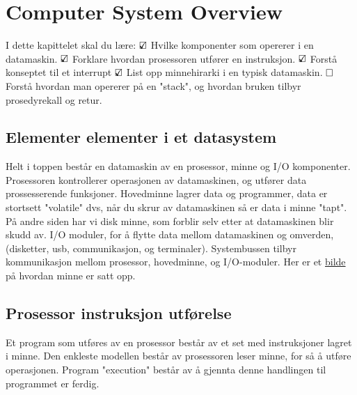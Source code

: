 \chapter{Computer System Overview}
I dette kapittelet skal du lære:\newline \newline
$\text{\rlap{$\checkmark$}}\square$ Hvilke komponenter som opererer i en datamaskin. \newline \newline
$\text{\rlap{$\checkmark$}}\square$ Forklare hvordan prosessoren utfører en instruksjon. \newline \newline
$\text{\rlap{$\checkmark$}}\square$ Forstå konseptet til et interrupt \newline \newline
$\text{\rlap{$\checkmark$}}\square$ List opp minnehirarki i en typisk datamaskin. \newline \newline
$\text{\rlap{}}\square$ Forstå hvordan man opererer på en "stack", og hvordan bruken tilbyr prosedyrekall og retur. \newline \newline

\section{Elementer elementer i et datasystem}
Helt i toppen består en datamaskin av en prosessor, minne og I/O komponenter.
Prosessoren kontrollerer operasjonen av datamaskinen, og utfører data prossesserende funksjoner.
\newline
Hovedminne lagrer data og programmer, data er stortsett "volatile" dvs, når du skrur av datamaskinen så er data i minne "tapt". På andre siden har vi disk minne, som forblir selv etter at datamaskinen blir skudd av.
\newline
I/O moduler, for å flytte data mellom datamaskinen og omverden, (disketter, usb, communikasjon, og terminaler). 
\newline
Systembussen tilbyr kommunikasjon mellom prosessor, hovedminne, og I/O-moduler. 
\newline
Her er et \href{http://images.slideplayer.com/13/4071565/slides/slide_2.jpg}{bilde} på hvordan minne er satt opp. 

\section{Prosessor instruksjon utførelse}
Et program som utføres av en prosessor består av et set med instruksjoner lagret i minne. Den enkleste modellen består av prosessoren leser minne, for så å utføre operasjonen. Program "execution" består av å gjennta denne handlingen til programmet er ferdig. 

